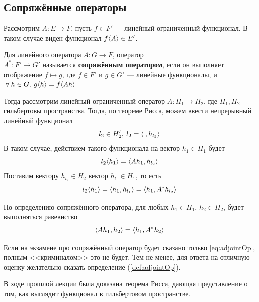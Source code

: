 \documentclass[12pt]{article}
\begin{document}
	\subsection{Сопряжённые операторы}

		Рассмотрим $A: E \rightarrow F$, пусть $f\in F'$ --- линейный ограниченный функционал.
		В таком случае виден функционал $f\langle A \rangle \in E'$.
	
		\begin{defi} \label{def:adjointOp}
			Для линейного оператора $A: G \rightarrow F$, оператор \\$A^{*}: F' \rightarrow G'$ 
			называется \textbf{сопряжённым оператором}, если он выполняет отображение $f \mapsto g$,
			где $f \in F'$ и $g \in G'$ --- линейные функционалы, и $\forall h \in G, \: g\angular{h} = f\angular{Ah}$
		\end{defi}

		Тогда рассмотрим линейный ограниченный оператор $A: H_1 \rightarrow H_2 $, 
		где $H_1, H_2$ --- гильбертовы пространства. Тогда, по теореме Рисса, можем ввести
		непрерывный линейный функционал 
		$$l_2 \in H_2', \: l_2 = \left\langle \:, h_{l_2} \right\rangle$$
		В таком случае, действием такого функционала на вектор $h_1 \in H_1$ будет
		$$l_2 \langle h_1 \rangle = \left\langle A h_1, h_{l_2} \right\rangle$$
		Поставим вектору $h_{l_2} \in H_2$ вектор $h_{l_1} \in H_1$, то есть
		$$ l_2 \langle h_1 \rangle = \left\langle h_1, h_{l_1} \right\rangle = \left\langle h_1, A^{*} h_{l_2} \right\rangle$$
	
		По определению сопряжённого оператора, для любых $h_1 \in H_1$, $h_2 \in H_2$, будет выполняться равевнство
		\begin{equation} \label{eq:adjointOp}
			\left\langle A h_1, h_2 \right\rangle = \left\langle h_1, A^{*} h_2 \right\rangle
		\end{equation}
	
		{ \color{gray}
			Если на экзамене про сопряжённый оператор будет сказано только \eqref{eq:adjointOp}, полным <<криминалом>> это не будет.
			Тем не менее, для ответа на отличную оценку желательно сказать определение (\ref{def:adjointOp}).
		}


		В ходе прошлой лекции была доказана теорема Рисса, дающая представление о том, как выглядит функционал в гильбертовом пространстве.
	
\end{document}
